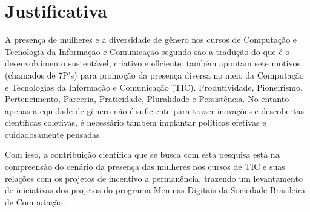 


\section{Justificativa}\label{sec:Justificativa}

A presença de mulheres e a diversidade de gênero nos cursos de Computação e Tecnologia da Informação e Comunicação segundo  são a tradução do que é o desenvolvimento sustentável, criativo e eficiente.
 também apontam sete
motivos (chamados de 7P’s) para promoção da presença diversa no meio da Computação e Tecnologias da Informação e Comunicação (TIC). Produtividade, Pioneirismo, Pertencimento, Parceria, Praticidade, Pluralidade e Persistência. No entanto apenas a equidade de gênero não é suficiente para trazer inovações e descobertas científicas coletivas, é necessário também implantar políticas efetivas e cuidadosamente pensadas.%

Com isso, a contribuição científica que se busca com esta pesquisa está na compreensão do cenário da presença das mulheres nos cursos de TIC e suas relações com os projetos de incentivo a permanência, trazendo um levantamento de iniciativas dos projetos do programa Meninas Digitais da Sociedade Brasileira de Computação.






